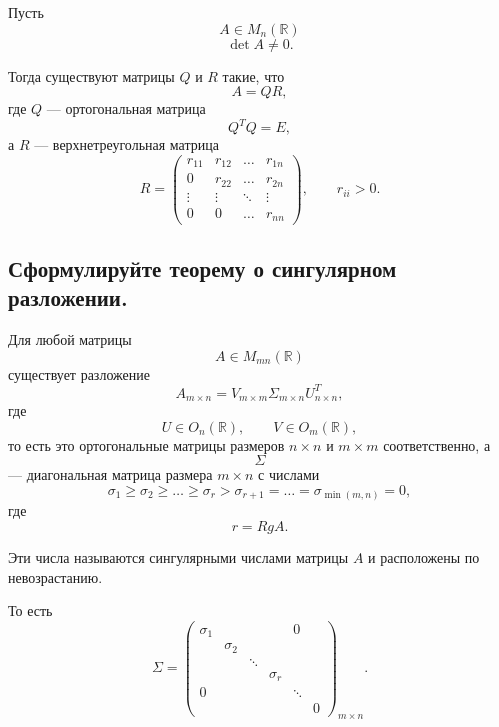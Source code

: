 \begin{theorem}[О QR-разложении]
    Пусть
    \[
        A \in M_n(\mathbb{R})
    \]
    \[
        \det A \neq 0.
    \]
    
    Тогда существуют матрицы $Q$ и $R$ такие, что
    \[
        A = QR,
    \]
    где $Q$ --- ортогональная матрица
    \[
        Q^TQ = E,
    \]
    а $R$ --- верхнетреугольная матрица
    \[
        R =
        \begin{pmatrix}
            r_{11} & r_{12} & \ldots & r_{1n} \\
            0 & r_{22} & \ldots & r_{2n} \\
            \vdots & \vdots & \ddots & \vdots \\
            0 & 0 & \ldots & r_{nn}
        \end{pmatrix},
        \qquad
        r_{ii} > 0.
    \]
\end{theorem}

\subsection{Сформулируйте теорему о сингулярном разложении.}

\begin{theorem}
    Для любой матрицы
    \[
        A \in M_{mn}(\mathbb{R})
    \]
    существует разложение
    \[
        A_{m \times n}
        =
        V_{m \times m}
        \Sigma_{m \times n}
        U^T_{n \times n},
    \]
    где
    \[
        U \in O_n(\mathbb{R}),
        \qquad
        V \in O_m(\mathbb{R}),
    \]
    то есть это ортогональные матрицы размеров $n \times n$ и $m \times m$ соответственно, а
    \[
        \Sigma
    \]
    --- диагональная матрица размера $m \times n$ с числами
    \[
        \sigma_1 \geq \sigma_2 \geq \ldots \geq \sigma_r
        >
        \sigma_{r+1}
        =
        \ldots
        =
        \sigma_{\min(m,n)} = 0,
    \]
    где
    \[
        r = RgA.
    \]
    
    Эти числа называются сингулярными числами матрицы $A$ и расположены по невозрастанию.
    
    То есть
    \[
        \Sigma =
        \begin{pmatrix}
            \sigma_1 &        &        &        & 0 \\
                     & \sigma_2 &        &        &   \\
                     &        & \ddots &        &   \\
                     &        &        & \sigma_r &   \\
            0        &        &  &        & \ddots   \\
                     &        &        &        &   &    0
        \end{pmatrix}_{m \times n}.
    \]
\end{theorem}

